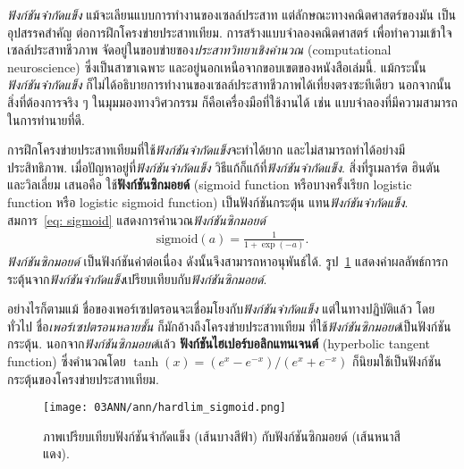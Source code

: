 \textit{ฟังก์ชันจำกัดแข็ง} แม้จะเลียนแบบการทำงานของเซลล์ประสาท แต่ลักษณะทางคณิตศาสตร์ของมัน
เป็นอุปสรรคสำคัญ
ต่อการฝึกโครงข่ายประสาทเทียม.
การสร้างแบบจำลองคณิตศาสตร์
เพื่อทำความเข้าใจเซลล์ประสาทชีวภาพ 
จัดอยู่ในขอบข่ายของ\textit{ประสาทวิทยาเชิงคำนวณ} (computational neuroscience) 
ซึ่งเป็นสาขาเฉพาะ และอยู่นอกเหนือจากขอบเขตของหนังสือเล่มนี้.
%
แม้กระนั้น \textit{ฟังก์ชันจำกัดแข็ง}
ก็ไม่ได้อธิบายการทำงานของเซลล์ประสาทชีวภาพได้เที่ยงตรงซะทีเดียว
นอกจากนั้น สิ่งที่ต้องการจริง ๆ ในมุมมองทางวิศวกรรม ก็คือเครื่องมือที่ใช้งานได้ เช่น แบบจำลองที่มีความสามารถในการทำนายที่ดี.

การฝึกโครงข่ายประสาทเทียมที่ใช้\textit{ฟังก์ชันจำกัดแข็ง}จะทำได้ยาก
และไม่สามารถทำได้อย่างมีประสิทธิภาพ.
%
เมื่อปัญหาอยู่ที่\textit{ฟังก์ชันจำกัดแข็ง} 
วิธีแก้ก็แก้ที่\textit{ฟังก์ชันจำกัดแข็ง}.
สิ่งที่รูเมลาร์ต ฮินตัน และวิลเลี่ยม\cite{RumelhartEtAl1986a} เสนอคือ ใช้\textbf{ฟังก์ชันซิกมอยด์} (sigmoid function หรือบางครั้งเรียก logistic function หรือ logistic sigmoid function)
เป็นฟังก์ชันกระตุ้น แทน\textit{ฟังก์ชันจำกัดแข็ง}.
สมการ~\ref{eq: sigmoid} แสดงการคำนวณ\textit{ฟังก์ชันซิกมอยด์}
\begin{eqnarray}
\mathrm{sigmoid}(a) = \frac{1}{1 + \exp(-a)}
\label{eq: sigmoid}.
\end{eqnarray}
\textit{ฟังก์ชันซิกมอยด์} เป็นฟังก์ชันค่าต่อเนื่อง ดังนั้นจึงสามารถหาอนุพันธ์ได้.
รูป~\ref{fig: ANN activation function} แสดงค่าผลลัพธ์การกระตุ้นจาก\textit{ฟังก์ชันจำกัดแข็ง}เปรียบเทียบกับ\textit{ฟังก์ชันซิกมอยด์}.


อย่างไรก็ตามแม้ ชื่อของเพอร์เซปตรอนจะเชื่อมโยงกับ\textit{ฟังก์ชันจำกัดแข็ง}
แต่ในทางปฏิบัติแล้ว 
โดยทั่วไป
ชื่อ\textit{เพอร์เซปตรอนหลายชั้น} ก็มักอ้างถึงโครงข่ายประสาทเทียม
ที่ใช้\textit{ฟังก์ชันซิกมอยด์}เป็นฟังก์ชันกระตุ้น.
นอกจาก\textit{ฟังก์ชันซิกมอยด์}แล้ว
\textbf{ฟังก์ชันไฮเปอร์บอลิกแทนเจนต์} (hyperbolic tangent function)
ซึ่งคำนวณโดย
$\tanh(x) = (e^x - e^{-x})/(e^x + e^{-x})$ 
ก็นิยมใช้เป็นฟังก์ชันกระตุ้นของโครงข่ายประสาทเทียม.

%
\begin{figure}
	\begin{center}
		\texttt{[image: 03ANN/ann/hardlim\_sigmoid.png]}
	\end{center}
	\caption[ฟังก์ชันจำกัดแข็งกับฟังก์ชันซิกมอยด์]{ภาพเปรียบเทียบฟังก์ชันจำกัดแข็ง (เส้นบางสีฟ้า) กับฟังก์ชันซิกมอยด์ (เส้นหนาสีแดง).}
	\label{fig: ANN activation function}
\end{figure}
%

